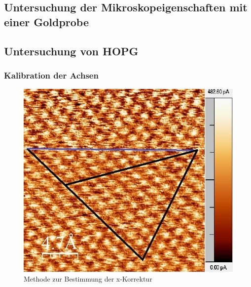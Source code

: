 \documentclass[12pt,a4paper]{article}
\begin{document}
\subsection{Untersuchung der Mikroskopeigenschaften mit einer Goldprobe}

\subsection{Untersuchung von HOPG}
\subsubsection{Kalibration der Achsen}

\begin{figure}
\centering
\includegraphics[scale=0.9]{Bilder/Atome/hoch2_h_scale.jpg}
\caption{Methode zur Bestimmung der x-Korrektur}
\label{fig:hoch2_h}
\end{figure}
\end{document}
